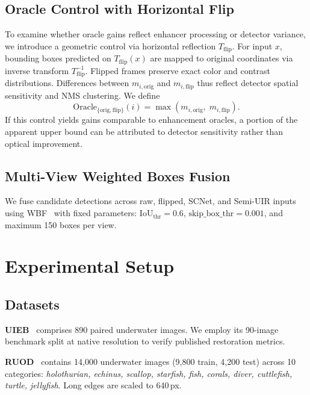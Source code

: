 \documentclass[runningheads]{llncs}
\begin{document}
\subsection{Oracle Control with Horizontal Flip}
\label{sec:method-noise}

To examine whether oracle gains reflect enhancer processing or detector variance, we introduce a geometric control via horizontal reflection $T_{\mathrm{flip}}$. For input $x$, bounding boxes predicted on $T_{\mathrm{flip}}(x)$ are mapped to original coordinates via inverse transform $T_{\mathrm{flip}}^{-1}$. Flipped frames preserve exact color and contrast distributions. Differences between $m_{i, \mathrm{orig}}$ and $m_{i, \mathrm{flip}}$ thus reflect detector spatial sensitivity and NMS clustering. We define
\begin{equation}
    \text{Oracle}_{\{\mathrm{orig}, \mathrm{flip}\}}(i) = \max \left( m_{i, \mathrm{orig}},\; m_{i, \mathrm{flip}} \right).
\end{equation}
If this control yields gains comparable to enhancement oracles, a portion of the apparent upper bound can be attributed to detector sensitivity rather than optical improvement.

\subsection{Multi-View Weighted Boxes Fusion}
\label{sec:method-wbf}

We fuse candidate detections across raw, flipped, SCNet, and Semi-UIR inputs using WBF~\cite{solovyevWeightedBoxesFusion2021} with fixed parameters: $\text{IoU}_{\mathrm{thr}} = 0.6$, $\text{skip\_box\_thr} = 0.001$, and maximum 150 boxes per view.

\section{Experimental Setup}
\label{sec:setup}

\subsection{Datasets}

\textbf{UIEB}~\cite{liUnderwaterImageEnhancement2019} comprises 890 paired underwater images. We employ its 90-image benchmark split at native resolution to verify published restoration metrics.

\textbf{RUOD}~\cite{fuRethinkingGeneralUnderwater2023} contains 14{,}000 underwater images (9{,}800 train, 4{,}200 test) across 10 categories: \emph{holothurian, echinus, scallop, starfish, fish, corals, diver, cuttlefish, turtle, jellyfish}. Long edges are scaled to 640\,px.
\end{document}
